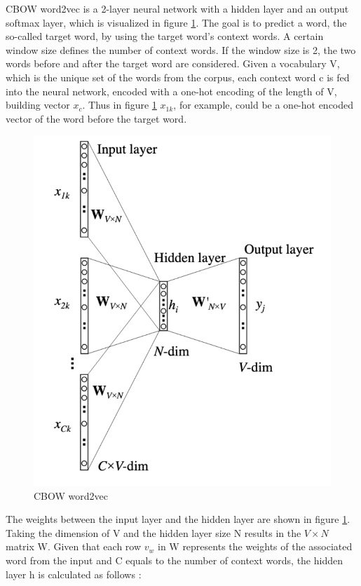 \documentclass[12pt, a4paper, titlepage]{article}
\begin{document}
\ac{CBOW} word2vec is a 2-layer neural network with a hidden layer and an output softmax layer, which is visualized in figure \ref{fig: F1}. The goal is to predict a word, the so-called target word, by using the target word's context words. A certain window size defines the number of context words. If the window size is 2, the two words before and after the target word are considered. Given a vocabulary V, which is the unique set of the words from the corpus, each context word c is fed into the neural network, encoded with a one-hot encoding of the length of V, building vector $x_c$. Thus in figure \ref*{fig: F1} $x_{1k}$, for example, could be a one-hot encoded vector of the word before the target word. 

\begin{figure}[]
  \center
  \includegraphics[scale=0.5]{word2vecCBOW.png}
  \caption[CBOW word2vec]{\label{fig: F1} CBOW word2vec \citep[6]{rong2014}}
\end{figure}

The weights between the input layer and the hidden layer are shown in figure \ref{fig: F1}. Taking the dimension of V and the hidden layer size N results in the $V \times N$ matrix W. Given that each row $v_w$ in W represents the weights of the associated word from the input and C equals to the number of context words, the hidden layer h is calculated as follows \citep{rong2014}:
\end{document}
